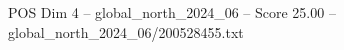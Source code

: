 \begin{textsample}{POS Dim 4 – global\_north\_2024\_06 – Score 25.00 – global\_north\_2024\_06/200528455.txt}
\end{textsample}
